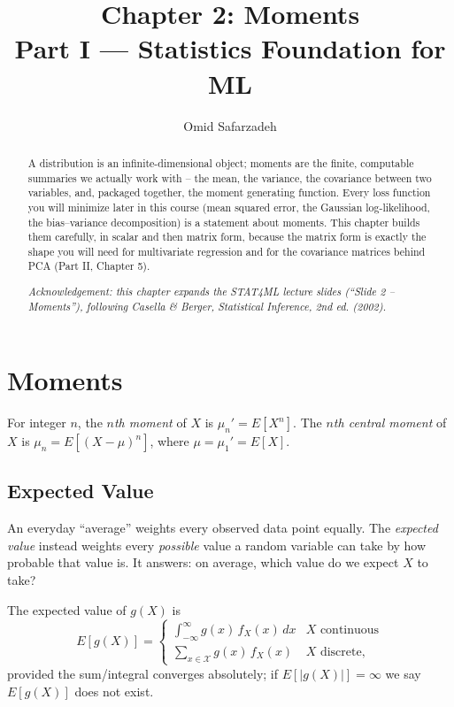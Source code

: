 \documentclass[11pt]{article}
\title{Chapter 2: Moments \\ \large Part I --- Statistics Foundation for ML}
\author{Omid Safarzadeh}
\date{}
\begin{document}
\maketitle

\begin{abstract}
\noindent
A distribution is an infinite-dimensional object; moments are the finite,
computable summaries we actually work with -- the mean, the variance, the
covariance between two variables, and, packaged together, the moment
generating function. Every loss function you will minimize later in this
course (mean squared error, the Gaussian log-likelihood, the bias--variance
decomposition) is a statement about moments. This chapter builds them
carefully, in scalar and then matrix form, because the matrix form is
exactly the shape you will need for multivariate regression and for the
covariance matrices behind PCA (Part II, Chapter 5).

\emph{Acknowledgement: this chapter expands the STAT4ML lecture slides
(``Slide 2 -- Moments''), following Casella \& Berger, \emph{Statistical
Inference}, 2nd ed. (2002).}
\end{abstract}

\tableofcontents

\section{Moments}

\begin{definition}
For integer $n$, the \emph{$n$th moment} of $X$ is $\mu_n' = E[X^n]$. The
\emph{$n$th central moment} of $X$ is $\mu_n = E[(X-\mu)^n]$, where
$\mu = \mu_1' = E[X]$.
\end{definition}

\subsection{Expected Value}

An everyday ``average'' weights every observed data point equally. The
\emph{expected value} instead weights every \emph{possible} value a random
variable can take by how probable that value is. It answers: on average,
which value do we expect $X$ to take?

\begin{definition}
The expected value of $g(X)$ is
\[
  E[g(X)] =
  \begin{cases}
    \displaystyle\int_{-\infty}^{\infty} g(x)\, f_X(x)\, dx & X \text{ continuous} \\[1em]
    \displaystyle\sum_{x \in \mathcal{X}} g(x)\, f_X(x) & X \text{ discrete,}
  \end{cases}
\]
provided the sum/integral converges absolutely; if $E[|g(X)|] = \infty$ we
say $E[g(X)]$ does not exist.
\end{definition}
\end{document}
